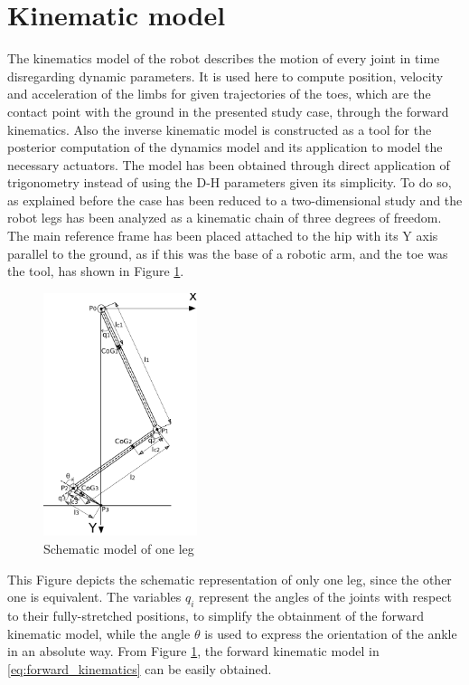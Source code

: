 
\section{Kinematic model}
\label{sec_kinematic_model}
The kinematics model of the robot describes the motion of every joint in time disregarding dynamic parameters.
It is used here to compute position, velocity and acceleration of the limbs for given trajectories of the toes, which are the contact point with the ground in the presented study case, through the forward kinematics.
Also the inverse kinematic model is constructed as a tool for the posterior computation of the dynamics model and its application to model the necessary actuators.
The model has been obtained through direct application of trigonometry instead of using the D-H parameters given its simplicity.
To do so, as explained before the case has been reduced to a two-dimensional study and the robot legs has been analyzed as a kinematic chain of three degrees of freedom.
The main reference frame has been placed attached to the hip with its Y axis parallel to the ground, as if this was the base of a robotic arm, and the toe was the tool, has shown in Figure \ref{fig:kinematics}.

\begin{figure}[h]
	\centering
	\includegraphics[width=0.4\textwidth]{figures/kinematics_model.pdf}
	\caption{Schematic model of one leg}
	\label{fig:kinematics}
\end{figure}

This Figure depicts the schematic representation of only one leg, since the other one is equivalent.
The variables $q_{i}$ represent the angles of the joints with respect to their fully-stretched positions, to simplify the obtainment of the forward kinematic model, while the angle $\theta$ is used to express the orientation of the ankle in an absolute way. 
From Figure \ref{fig:kinematics}, the forward kinematic model in \ref{eq:forward_kinematics} can be easily obtained.

